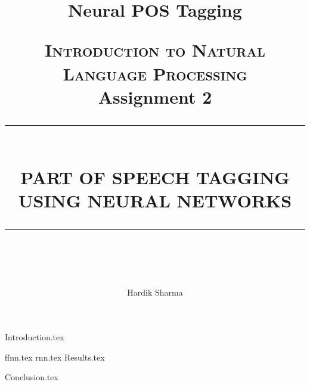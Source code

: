 \documentclass[a4paper,9pt]{report}
\title{Neural POS Tagging }
\newcommand{\HRule}[1]{\rule{\linewidth}{#1}}
\begin{document}
\title{ \normalsize \textsc{\LARGE Introduction to Natural Language Processing}
		\\ [2.0cm]
        \LARGE Assignment 2 
		\HRule{0.5pt} \\
		\LARGE \textbf{\uppercase{Part of Speech Tagging using Neural Networks}}
		\HRule{2pt} \\ [0.5cm]
		\normalsize \vspace*{3\baselineskip}}
        \date{ }

\author{Hardik Sharma}

\maketitle

%
%

{Introduction.tex}

{ffnn.tex}
%
{rnn.tex}
%
{Results.tex}
%

{Conclusion.tex}
\end{document}
